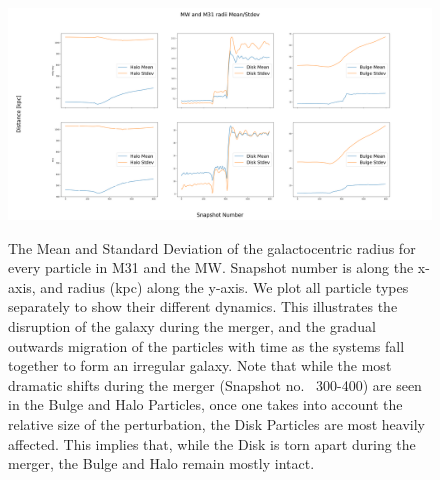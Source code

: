 \documentclass[linenumbers]{aastex631} %
\begin{document}
\begin{figure}
    \centering
    \includegraphics[width = \linewidth]{figures/meanstdev.png}
    \label{fig:meanstdev}
    \caption{The Mean and Standard Deviation of the galactocentric radius for every particle in M31 and the MW. Snapshot number is along the x-axis, and radius (kpc) along the y-axis. We plot all particle types separately to show their different dynamics. This illustrates the disruption of the galaxy during the merger, and the gradual outwards migration of the particles with time as the systems fall together to form an irregular galaxy. Note that while the most dramatic shifts during the merger (Snapshot no. ~300-400) are seen in the Bulge and Halo Particles, once one takes into account the relative size of the perturbation, the Disk Particles are most heavily affected. This implies that, while the Disk is torn apart during the merger, the Bulge and Halo remain mostly intact.}
\end{figure}
\end{document}
